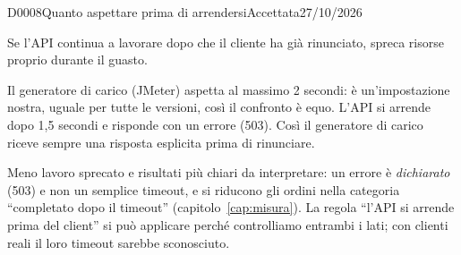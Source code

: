 \begin{decisione}{D0008}{Quanto aspettare prima di arrendersi}{Accettata}{27/10/2026}

\contesto
Se l'API continua a lavorare dopo che il cliente ha già rinunciato, spreca risorse proprio durante il guasto.

\scelta
Il generatore di carico (JMeter) aspetta al massimo 2 secondi: è un'impostazione nostra, uguale per tutte le versioni, così il confronto è equo. L'API si arrende dopo 1,5 secondi e risponde con un errore (503). Così il generatore di carico riceve sempre una risposta esplicita prima di rinunciare.

\conseguenze
Meno lavoro sprecato e risultati più chiari da interpretare: un errore è \emph{dichiarato} (503) e non un semplice timeout, e si riducono gli ordini nella categoria ``completato dopo il timeout'' (capitolo~\ref{cap:misura}). La regola ``l'API si arrende prima del client'' si può applicare perché controlliamo entrambi i lati; con clienti reali il loro timeout sarebbe sconosciuto.

\end{decisione}
